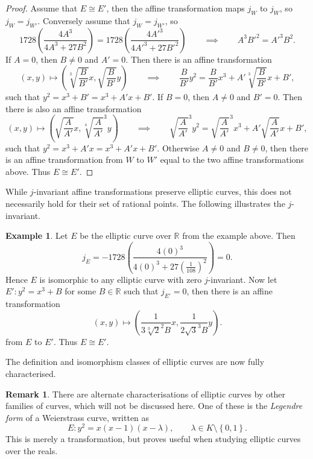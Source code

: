 \documentclass{article}
\newcommand{\R}{\mathbb{R}}
\newcommand{\rb}[1]{\left( #1 \right)}
\newcommand{\cb}[1]{\left\{ #1 \right\}}
\theoremstyle{definition}
\newtheorem*{example}{Example}
\newtheorem*{remark}{Remark}
\begin{document}
\begin{proof}
Assume that $ E \cong E' $, then the affine transformation maps $ j_W $ to $ j_W $, so $ j_W = j_{W'} $. Conversely assume that $ j_W = j_{W'} $, so
$$ 1728\rb{\dfrac{4A^3}{4A^3 + 27B^2}} = 1728\rb{\dfrac{4A'^3}{4A'^3 + 27B'^2}} \qquad \implies \qquad A^3B'^2 = A'^3B^2. $$
If $ A = 0 $, then $ B \ne 0 $ and $ A' = 0 $. Then there is an affine transformation
$$ \rb{x, y} \mapsto \rb{\sqrt[3]{\dfrac{B}{B'}}x, \sqrt{\dfrac{B}{B'}}y} \qquad \implies \qquad \dfrac{B}{B'}y^2 = \dfrac{B}{B'}x^3 + A'\sqrt[3]{\dfrac{B}{B'}}x + B', $$
such that $ y^2 = x^3 + B' = x^3 + A'x + B' $. If $ B = 0 $, then $ A \ne 0 $ and $ B' = 0 $. Then there is also an affine transformation
$$ \rb{x, y} \mapsto \rb{\sqrt{\dfrac{A}{A'}}x, \sqrt[4]{\dfrac{A}{A'}}^3y} \qquad \implies \qquad \sqrt{\dfrac{A}{A'}}^3y^2 = \sqrt{\dfrac{A}{A'}}^3x^3 + A'\sqrt{\dfrac{A}{A'}}x + B', $$
such that $ y^2 = x^3 + A'x = x^3 + A'x + B' $. Otherwise $ A \ne 0 $ and $ B \ne 0 $, then there is an affine transformation from $ W $ to $ W' $ equal to the two affine transformations above. Thus $ E \cong E' $.
\end{proof}

While $ j $-invariant affine transformations preserve elliptic curves, this does not necessarily hold for their set of rational points. The following illustrates the $ j $-invariant.

\begin{example}
Let $ E $ be the elliptic curve over $ \R $ from the example above. Then
$$ j_E = -1728\rb{\dfrac{4\rb{0}^3}{4\rb{0}^3 + 27\rb{\frac{1}{108}}^2}} = 0. $$
Hence $ E $ is isomorphic to any elliptic curve with zero $ j $-invariant. Now let $ E' : y^2 = x^3 + B $ for some $ B \in \R $ such that $ j_{E'} = 0 $, then there is an affine transformation
$$ \rb{x, y} \mapsto \rb{\dfrac{1}{3\sqrt[3]{2}^2B}x, \dfrac{1}{2\sqrt{3}^3B}y}. $$
from $ E $ to $ E' $. Thus $ E \cong E' $.
\end{example}

The definition and isomorphism classes of elliptic curves are now fully characterised.

\begin{remark}
There are alternate characterisations of elliptic curves by other families of curves, which will not be discussed here. One of these is the \emph{Legendre form} of a Weierstrass curve, written as
$$ E : y^2 = x\rb{x - 1}\rb{x - \lambda}, \qquad \lambda \in K \setminus \cb{0, 1}. $$
This is merely a transformation, but proves useful when studying elliptic curves over the reals.
\end{remark}
\end{document}
